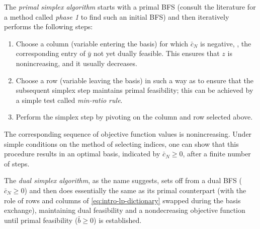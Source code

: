The \emph{primal simplex algorithm} starts with a primal BFS (consult the literature for a method called \emph{phase 1} to find such an initial BFS) and then iteratively performs the following steps:
\begin{enumerate}
  \item Choose a column (variable entering the basis) for which $\bar c_N$ is negative, \ie, the corresponding entry of $\bar y$ not yet dually feasible. This ensures that $z$ is nonincreasing, and it usually decreases.
  \item Choose a row (variable leaving the basis) in such a way as to ensure that the subsequent simplex step maintains primal feasibility; this can be achieved by a simple test called \emph{min-ratio rule}.
  \item Perform the simplex step by pivoting on the column and row selected above.
\end{enumerate}  The corresponding sequence of objective function values is nonincreasing. Under simple conditions on the method of selecting indices, one can show that this procedure results in an optimal basis, indicated by $\bar c_N ≥ 0$, after a finite number of steps.

The \emph{dual simplex algorithm}, as the name suggests, sets off from a dual BFS ($\bar c_N ≥ 0$) and then does essentially the same as its primal counterpart (with the role of rows and columns of \cref{eq:intro-lp-dictionary} swapped during the basis exchange), maintaining dual feasibility and a nondecreasing objective function until primal feasibility ($\bar b ≥ 0$) is established.

